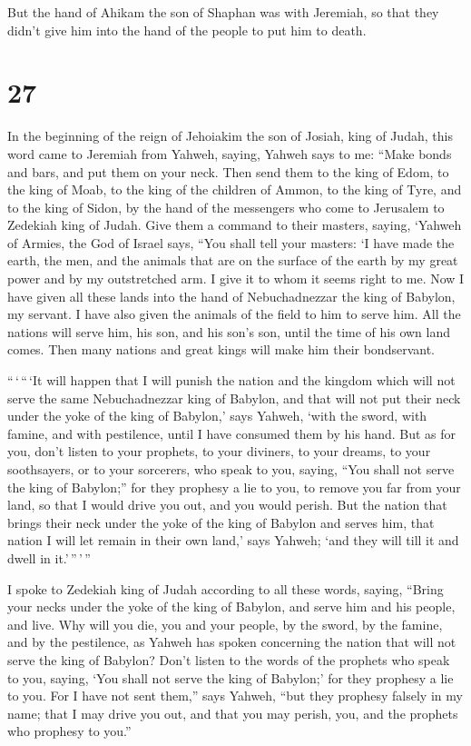  But the hand of Ahikam the son of Shaphan was with
Jeremiah, so that they didn't give him into the hand of the people to
put him to death.

\hypertarget{section-26}{%
\section{27}\label{section-26}}

 In the beginning of the reign of Jehoiakim the son of
Josiah, king of Judah, this word came to Jeremiah from Yahweh, saying,
 Yahweh says to me: ``Make bonds and bars, and put them on
your neck.  Then send them to the king of Edom, to the king
of Moab, to the king of the children of Ammon, to the king of Tyre, and
to the king of Sidon, by the hand of the messengers who come to
Jerusalem to Zedekiah king of Judah.  Give them a command to
their masters, saying, `Yahweh of Armies, the God of Israel says, ``You
shall tell your masters:  `I have made the earth, the men,
and the animals that are on the surface of the earth by my great power
and by my outstretched arm. I give it to whom it seems right to me.
 Now I have given all these lands into the hand of
Nebuchadnezzar the king of Babylon, my servant. I have also given the
animals of the field to him to serve him.  All the nations
will serve him, his son, and his son's son, until the time of his own
land comes. Then many nations and great kings will make him their
bondservant.

 ``\,`\,``\,`It will happen that I will punish the nation
and the kingdom which will not serve the same Nebuchadnezzar king of
Babylon, and that will not put their neck under the yoke of the king of
Babylon,' says Yahweh, `with the sword, with famine, and with
pestilence, until I have consumed them by his hand.  But as
for you, don't listen to your prophets, to your diviners, to your
dreams, to your soothsayers, or to your sorcerers, who speak to you,
saying, ``You shall not serve the king of Babylon;''  for
they prophesy a lie to you, to remove you far from your land, so that I
would drive you out, and you would perish.  But the nation
that brings their neck under the yoke of the king of Babylon and serves
him, that nation I will let remain in their own land,' says Yahweh; `and
they will till it and dwell in it.'\,''\,'\,''

 I spoke to Zedekiah king of Judah according to all these
words, saying, ``Bring your necks under the yoke of the king of Babylon,
and serve him and his people, and live.  Why will you die,
you and your people, by the sword, by the famine, and by the pestilence,
as Yahweh has spoken concerning the nation that will not serve the king
of Babylon?  Don't listen to the words of the prophets who
speak to you, saying, `You shall not serve the king of Babylon;' for
they prophesy a lie to you.  For I have not sent them,''
says Yahweh, ``but they prophesy falsely in my name; that I may drive
you out, and that you may perish, you, and the prophets who prophesy to
you.''

